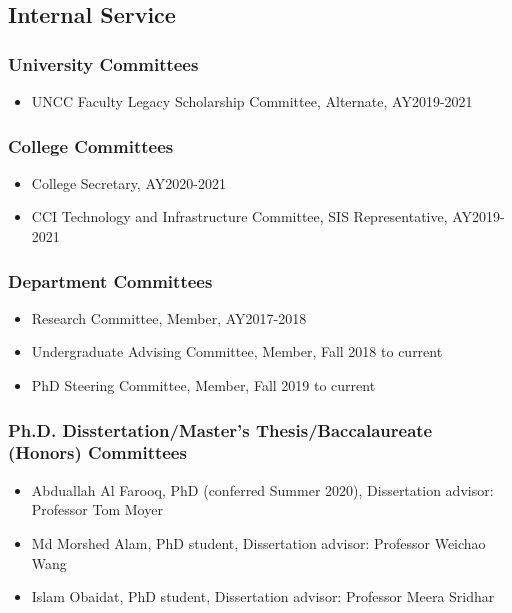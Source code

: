 
\hypertarget{internal-service}{%
\subsection{Internal Service}\label{internal-service}}

\hypertarget{university-committees}{%
\subsubsection{University Committees}\label{university-committees}}
\begin{itemize}
\item UNCC Faculty Legacy Scholarship Committee, Alternate, AY2019-2021
\end{itemize}

\hypertarget{college-committees}{%
\subsubsection{College Committees}\label{college-committees}}
\begin{itemize}
\item College Secretary, AY2020-2021
\item CCI Technology and Infrastructure Committee, SIS Representative, AY2019-2021
\end{itemize}

\hypertarget{dept-committees}{%
\subsubsection{Department Committees}\label{dept-committees}}
\begin{itemize}
\item Research Committee, Member, AY2017-2018
\item Undergraduate Advising Committee, Member, Fall 2018 to current
\item PhD Steering Committee, Member, Fall 2019 to current
\end{itemize}

\hypertarget{thesis-committees}{%
\subsubsection{Ph.D. Disstertation/Master's Thesis/Baccalaureate (Honors) Committees}\label{thesis-committees}}
\begin{itemize}
\item Abduallah Al Farooq, PhD (conferred Summer 2020), Dissertation advisor: Professor Tom Moyer
\item Md Morshed Alam, PhD student, Dissertation advisor: Professor Weichao Wang
\item Islam Obaidat, PhD student, Dissertation advisor: Professor Meera Sridhar
\end{itemize}

